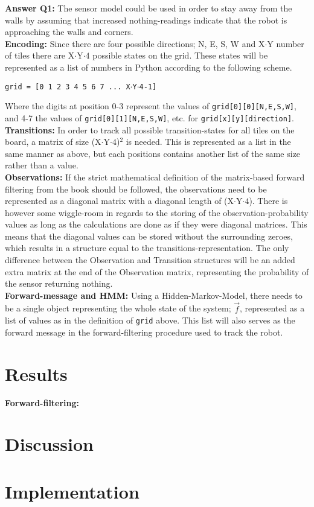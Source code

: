 \documentclass{article}
\begin{document}
    \textbf{Answer Q1:} The sensor model could be used in order to stay away
    from the walls by assuming that increased nothing-readings indicate that
    the robot is approaching the walls and corners. \\

    \textbf{Encoding:} Since there are four possible directions; N, E, S, W
    and X$\cdot$Y number of tiles there are X${\cdot}$Y${\cdot}4$ possible
    states on the grid. These states will be represented as a list of numbers
    in Python according to the following scheme.

    \begin{center}
      \texttt{grid = [0 1 2 3 4 5 6 7 ...\ X$\cdot$Y$\cdot$4-1] }
    \end{center}

    Where the digits at position 0-3 represent the values of
    \texttt{grid[0][0][N,E,S,W]}, and 4-7 the values of
    \texttt{grid[0][1][N,E,S,W]}, etc. for \texttt{grid[x][y][direction]}. \\

    \textbf{Transitions:} In order to track all possible transition-states for
    all tiles on the board, a matrix of size (X${\cdot}$Y${\cdot}4$)$^2$ is
    needed. This is represented as a list in the same manner as above, but each
    positions contains another list of the same size rather than a value. \\

    \textbf{Observations:} If the strict mathematical definition of the
    matrix-based forward filtering from the book should be followed, the
    observations need to be represented as a diagonal matrix with a diagonal
    length of (X${\cdot}$Y${\cdot}4$). There is however some wiggle-room in
    regards to the storing of the observation-probability values as long as the
    calculations are done as if they were diagonal matrices. This means that the
    diagonal values can be stored without the surrounding zeroes, which results
    in a structure equal to the transitions-representation.
    The only difference between the Observation and Transition structures will
    be an added extra matrix at the end of the Observation matrix, representing
    the probability of the sensor returning nothing. \\

    \textbf{Forward-message and HMM:} Using a Hidden-Markov-Model, there
    needs to be a single object representing the whole state of the system;
    $\vec{f}$, represented as a list of values as in the definition of
    \texttt{grid} above. This list will also serves as the forward message in
    the forward-filtering procedure used to track the robot.

  \section*{Results}

    \textbf{Forward-filtering:}

  \section*{Discussion}
  \section*{Implementation}
\end{document}
